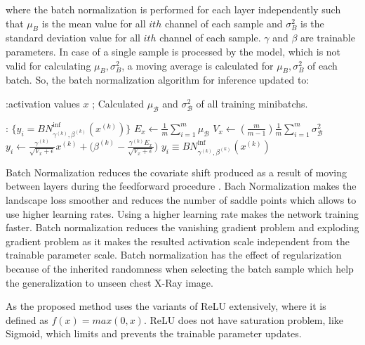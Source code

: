 where the batch normalization is performed for each layer independently such that $\mu_B$ is the mean value for all $ith$ channel of each sample and $\sigma_B^2$ is the standard deviation value for all $ith$ channel of each sample. $\gamma$ and $\beta$ are  trainable parameters.  In case of a single sample is processed by the model, which is not valid for calculating $\mu_B, \sigma_B^2$, a moving average is calculated for $\mu_B, \sigma_B^2$ of each batch. So, the batch normalization algorithm for inference updated to:



\begin{algorithmic}[1]

\REQUIRE :activation values $x$ ; Calculated $\mu_{\mathcal B}$ and $\sigma^2_{\mathcal B}$ of all training minibatchs.

\ENSURE  : $\{y_i = BN^{\text{inf}}_{\gamma^{(k)},\beta^{(k)}}(x^{(k)})\}$
\vspace*{.7\baselineskip}
\STATE $E_x \leftarrow \frac1m \sum_{i = 1}^m \mu_{\mathcal B}$
\vspace*{.7\baselineskip}
\STATE $ V_x \leftarrow  (\frac{m}{m-1}) \frac1m \sum_{i=1}^m \sigma^2_{\mathcal B} $
\vspace*{.7\baselineskip}
\STATE
$y_i \leftarrow
\frac{\gamma^{(k)}}{\sqrt{V_x+\epsilon}}x^{(k)}+
\Bigg(\beta^{(k)}-\frac{\gamma^{(k)} E_x }{\sqrt{V_x + \epsilon}}\Bigg)$
\vspace*{.7\baselineskip}
\STATE
$y_i \equiv  BN^{\text{inf}}_{\gamma^{(k)},\beta^{(k)}}(x^{(k)})$
\end{algorithmic}





Batch Normalization \cite{batchnorm} reduces the covariate shift produced as a result of  moving between layers during the feedforward procedure \cite{batchnorm}. Bach Normalization makes the landscape loss smoother and reduces the number of saddle points \cite{bnopt} which allows to use higher learning rates. Using a higher learning rate makes the network training  faster\cite{batchnorm}. Batch normalization reduces the vanishing gradient problem and exploding gradient problem as it makes the resulted activation scale independent from the trainable parameter scale\cite{batchnorm}. Batch normalization has the effect of regularization because of the inherited randomness when selecting the batch sample\cite{batchnorm} which help the generalization to unseen chest X-Ray image.

As  the proposed method   uses  the variants of ReLU \cite{alexnet} extensively, where it is defined as $f(x) = max(0,x)$. ReLU does not have saturation problem, like Sigmoid, which limits and prevents the trainable parameter updates.

